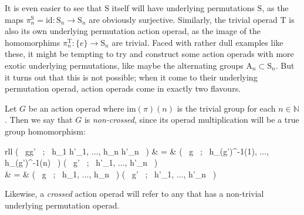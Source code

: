 It is even easier to see that $\mathrm{S}$ itself will have underlying permutations $\mathrm{S}$, as the maps $\pi^{\mathrm{S}}_n = \mathrm{id} : \mathrm{S}_n \to \mathrm{S}_n$ are obviously surjective. Similarly, the trivial operad $\mathrm{T}$ is also its own underlying permutation action operad, as the image of the homomorphims $\pi^{\mathrm{T}}_n : \{ e \} \to \mathrm{S}_n$ are trivial. Faced with rather dull examples like these, it might be tempting to try and construct some action operads with more exotic underlying permutations, like maybe the alternating groups $\mathrm{A}_n \subset \mathrm{S}_n$. But it turns out that this is not possible; when it come to their underlying permutation operad, action operads come in exactly two flavours.

\begin{defn} Let $G$ be an action operad where $\mathrm{im}(\pi)(n)$ is the trivial group for each $n \in \mathbb{N}$. Then we say that $G$ is \emph{non-crossed}, since its operad multiplication will be a true group homomorphism:
\begin{eq*} \begin{array}{rll}
			\mu( \, gg' \, ; \, h_1 h'_1, ..., h_n h'_n \, ) & = & \mu( \, g \, ; \, h_{\pi(g')^{-1}(1)}, ..., h_{\pi(g')^{-1}(n)} \, ) \mu( \, g' \, ; \, h'_1, ..., h'_n \, ) \\
			& = & \mu( \, g \, ; \, h_1, ..., h_n \, ) \mu( \, g' \, ; \, h'_1, ..., h'_n \, ) \\
		\end{array}
\end{eq*}
Likewise, a \emph{crossed} action operad will refer to any that has a non-trivial underlying permutation operad.
\end{defn}


